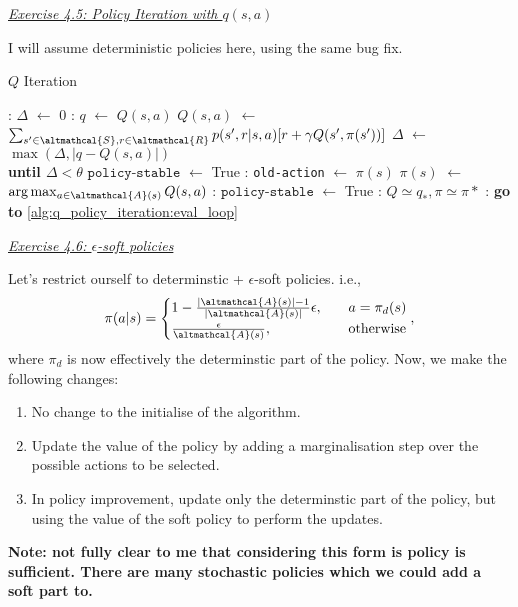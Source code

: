 \documentclass{article}
\newcommand{\myq}[1]{%
	\vspace{1em}
	\noindent\underline{\emph{Exercise #1}}\vspace{0.25em}\linebreak
}
\newcommand*\Let[2]{\State #1 $\gets$ #2}
\begin{document}
\myq{4.5: Policy Iteration with $q(s, a)$}
I will assume deterministic policies here, using the same bug fix. 
\begin{algorithm}[H]
	\caption{$Q$ Iteration
		\label{alg:q_policy_eval}}
	\begin{algorithmic}[1]
		\Statex
		\Loop:  \label{alg:q_policy_iteration:eval_loop}
		\Let{$\Delta$}{0}
		: 
		\Let{$q$}{$Q(s, a)$}
		\Let{$Q(s, a)$}{$\sum_{s' \in \altmathcal{S}, r \in \altmathcal{R}} p(s', r | s, a)[r + \gamma Q(s', \pi(s'))]$}
		\Let{$\Delta$}{$\max(\Delta, |q - Q(s, a)|)$}
		\EndFor
		\EndFor
		\EndLoop\\\textbf{until $\Delta < \theta$}
		\Statex
		\Let{$\texttt{policy-stable}$}{True} 
		: 
		\Let{\texttt{old-action}}{$\pi(s)$}
		\Let{$\pi(s)$}{$\arg \max_{a \in \altmathcal{A}(s)} Q(s, a)$} 
		: 
		\Let{$\texttt{policy-stable}$}{True}
		\EndIf
		\EndFor
		:
		\State \Return $Q \simeq q_*, \pi 
		\simeq \pi* $
		\Else: \State \textbf{ go to} \ref{alg:q_policy_iteration:eval_loop}
		\EndIf
	\end{algorithmic}
\end{algorithm}

\myq{4.6: $\epsilon$-soft policies}
Let's restrict ourself to determinstic + $\epsilon$-soft policies. i.e.,
\begin{align}
\pi(a | s) = \begin{cases}
1 - \frac{|\altmathcal{A}(s)| - 1 }{|\altmathcal{A}(s)|}\epsilon, \quad &a = \pi_d(s) \\
\frac{\epsilon}{\altmathcal{A}(s)}, &\text{otherwise}
\end{cases},
\end{align}
where $\pi_d$ is now effectively the determinstic part of the policy. Now, we make the following changes:
\begin{enumerate}[noitemsep]
	\item No change to the initialise of the algorithm. 
	\item Update the value of the policy by adding a marginalisation step over the possible actions to be selected. 
	\item In policy improvement, update only the determinstic part of the policy, but using the value of the soft policy to perform the updates. 
\end{enumerate}

\textbf{Note: not fully clear to me that considering this form is policy is sufficient. There are many stochastic policies which we could add a soft part to.}
\end{document}
